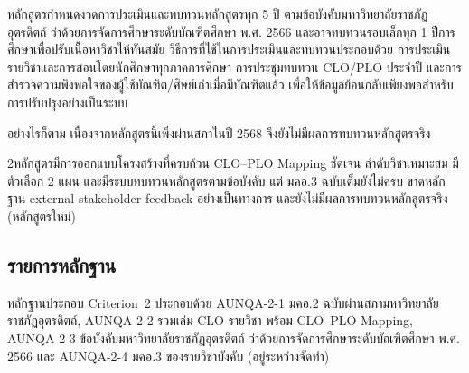 
หลักสูตรกำหนดงวดการประเมินและทบทวนหลักสูตรทุก 5 ปี ตามข้อบังคับมหาวิทยาลัยราชภัฏอุตรดิตถ์ ว่าด้วยการจัดการศึกษาระดับบัณฑิตศึกษา พ.ศ. 2566 และอาจทบทวนรอบเล็กทุก 1 ปีการศึกษาเพื่อปรับเนื้อหาวิชาให้ทันสมัย วิธีการที่ใช้ในการประเมินและทบทวนประกอบด้วย
การประเมินรายวิชาและการสอนโดยนักศึกษาทุกภาคการศึกษา การประชุมทบทวน CLO/PLO ประจำปี และการสำรวจความพึงพอใจของผู้ใช้บัณฑิต/ศิษย์เก่าเมื่อมีบัณฑิตแล้ว เพื่อให้ข้อมูลย้อนกลับเพียงพอสำหรับการปรับปรุงอย่างเป็นระบบ

อย่างไรก็ตาม เนื่องจากหลักสูตรนี้เพิ่งผ่านสภาในปี 2568 จึงยังไม่มีผลการทบทวนหลักสูตรจริง

\begin{selfassessmentbox}{2}{หลักสูตรมีการออกแบบโครงสร้างที่ครบถ้วน CLO--PLO Mapping ชัดเจน ลำดับวิชาเหมาะสม มีตัวเลือก 2 แผน และมีระบบทบทวนหลักสูตรตามข้อบังคับ แต่ มคอ.3 ฉบับเต็มยังไม่ครบ ขาดหลักฐาน external stakeholder feedback อย่างเป็นทางการ และยังไม่มีผลการทบทวนหลักสูตรจริง (หลักสูตรใหม่)}
\end{selfassessmentbox}

\subsection*{รายการหลักฐาน}

หลักฐานประกอบ Criterion~2 ประกอบด้วย AUNQA-2-1 มคอ.2 ฉบับผ่านสภามหาวิทยาลัยราชภัฏอุตรดิตถ์, AUNQA-2-2 รวมเล่ม CLO รายวิชา พร้อม CLO--PLO Mapping, AUNQA-2-3 ข้อบังคับมหาวิทยาลัยราชภัฏอุตรดิตถ์ ว่าด้วยการจัดการศึกษาระดับบัณฑิตศึกษา พ.ศ. 2566 และ AUNQA-2-4 มคอ.3 ของรายวิชาบังคับ (อยู่ระหว่างจัดทำ)
